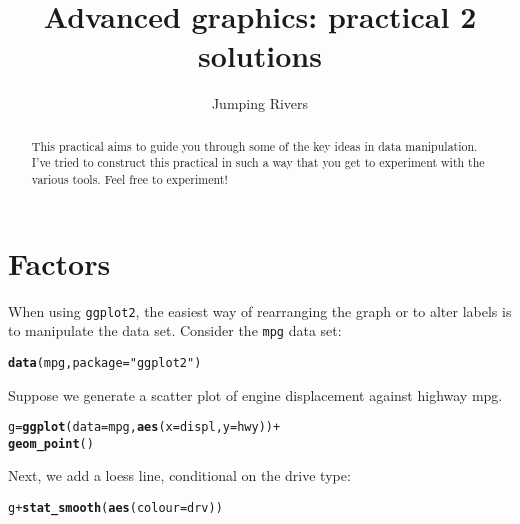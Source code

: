 \documentclass[a4paper,justified,openany]{tufte-handout}\usepackage[]{graphicx}\usepackage[]{color}
\title{Advanced graphics: practical 2 solutions}
\author[Jumping Rivers]{Jumping Rivers}
\date{}  %
\makeatletter
\newcommand{\hlstr}[1]{\textcolor[rgb]{0.2,0.2,0.2}{#1}}%
\newcommand{\hlopt}[1]{\textcolor[rgb]{0.102,0.102,0.102}{#1}}%
\newcommand{\hlstd}[1]{\textcolor[rgb]{0.102,0.102,0.102}{#1}}%
\newcommand{\hlkwb}[1]{\textcolor[rgb]{0.102,0.102,0.102}{#1}}%
\newcommand{\hlkwc}[1]{\textcolor[rgb]{0.2,0.2,0.2}{#1}}%
\newcommand{\hlkwd}[1]{\textcolor[rgb]{0.102,0.102,0.102}{\textbf{#1}}}%
\newenvironment{kframe}{%
 \def\at@end@of@kframe{}%
 \ifinner\ifhmode%
  \def\at@end@of@kframe{\end{minipage}}%
  \begin{minipage}{\columnwidth}%
 \fi\fi%
 \def\FrameCommand##1{\hskip\@totalleftmargin \hskip-\fboxsep
 \colorbox{shadecolor}{##1}\hskip-\fboxsep
     \hskip-\linewidth \hskip-\@totalleftmargin \hskip\columnwidth}%
 \MakeFramed {\advance\hsize-\width
   \@totalleftmargin\z@ \linewidth\hsize
   \@setminipage}}%
 {\par\unskip\endMakeFramed%
 \at@end@of@kframe}
\newenvironment{knitrout}{}{} %
\newcommand{\cc}{\texttt}
\makeatother
\begin{document}
\maketitle%

\begin{abstract}
  \noindent This practical aims to guide you through some of the key ideas in
  data manipulation. I've tried to construct this practical in such a way that
  you get to experiment with the various tools. Feel free to experiment!
\end{abstract}


\section{Factors}

When using \cc{ggplot2}, the easiest way of rearranging the graph or to alter labels
is to manipulate the data set. Consider the \cc{mpg} data set:

\begin{knitrout}
\color{fgcolor}\begin{kframe}
\begin{alltt}
\hlkwd{data}\hlstd{(mpg,} \hlkwc{package} \hlstd{=} \hlstr{"ggplot2"}\hlstd{)}
\end{alltt}
\end{kframe}
\end{knitrout}

Suppose we generate a scatter plot of engine displacement against highway mpg.

\begin{knitrout}
\color{fgcolor}\begin{kframe}
\begin{alltt}
\hlstd{g} \hlkwb{=} \hlkwd{ggplot}\hlstd{(}\hlkwc{data}\hlstd{=mpg,} \hlkwd{aes}\hlstd{(}\hlkwc{x}\hlstd{=displ,} \hlkwc{y}\hlstd{=hwy))} \hlopt{+}
  \hlkwd{geom_point}\hlstd{()}
\end{alltt}
\end{kframe}
\end{knitrout}

\noindent Next, we add a loess line, conditional on the drive type:

\begin{knitrout}
\color{fgcolor}\begin{kframe}
\begin{alltt}
\hlstd{g} \hlopt{+} \hlkwd{stat_smooth}\hlstd{(}\hlkwd{aes}\hlstd{(}\hlkwc{colour}\hlstd{=drv))}
\end{alltt}
\end{kframe}
\end{knitrout}
\end{document}
